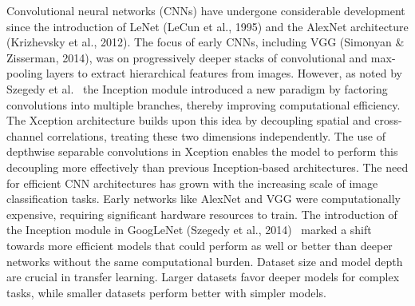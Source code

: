 \documentclass[conference]{IEEEtran}
\begin{document}
Convolutional neural networks (CNNs) have undergone considerable development since the introduction of LeNet (LeCun et al., 1995) and the AlexNet architecture (Krizhevsky et al., 2012). The focus of early CNNs, including VGG (Simonyan \& Zisserman, 2014), was on progressively deeper stacks of convolutional and max-pooling layers to extract hierarchical features from images. However, as noted by Szegedy et al.~\cite{b9} the Inception module introduced a new paradigm by factoring convolutions into multiple branches, thereby improving computational efficiency. The Xception architecture builds upon this idea by decoupling spatial and cross-channel correlations, treating these two dimensions independently. The use of depthwise separable convolutions in Xception enables the model to perform this decoupling more effectively than previous Inception-based architectures. The need for efficient CNN architectures has grown with the increasing scale of image classification tasks. Early networks like AlexNet and VGG were computationally expensive, requiring significant hardware resources to train. The introduction of the Inception module in GoogLeNet (Szegedy et al., 2014)~\cite{b10} marked a shift towards more efficient models that could perform as well or better than deeper networks without the same computational burden. Dataset size and model depth are crucial in transfer learning. Larger datasets favor deeper models for complex tasks, while smaller datasets perform better with simpler models.
\end{document}
